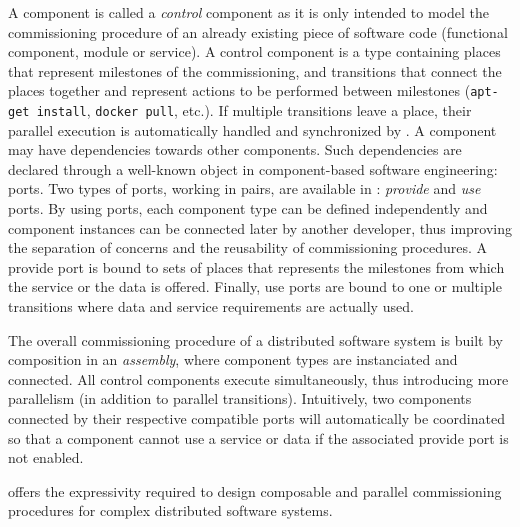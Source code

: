 A \mad component is called a \emph{control} component as it is only
intended to model the commissioning procedure of an already existing
piece of software code (functional component, module or service). A
\mad control component is a type containing places that represent
milestones of the commissioning, and transitions that connect the
places together and represent actions to be performed between
milestones (\eg \texttt{apt-get install}, \texttt{docker pull},
etc.). If multiple transitions leave a place, their parallel execution
is automatically handled and synchronized by \mad. A component may
have dependencies towards other components. Such dependencies are
declared through a well-known object in component-based software
engineering: ports. Two types of ports, working in pairs, are
available in \mad: \emph{provide} and \emph{use} ports. By using
ports, each component type can be defined independently and component
instances can be connected later by another developer, thus improving
the separation of concerns and the reusability of commissioning
procedures. A provide port is bound to sets of places that represents
the milestones from which the service or the data is offered. Finally,
use ports are bound to one or multiple transitions where data and
service requirements are actually used.

The overall commissioning procedure of a distributed software system
is built by composition in an \emph{assembly}, where component
types are instanciated and connected. All control components execute
simultaneously, thus introducing more parallelism (in addition to
parallel transitions). Intuitively, two components connected by their
respective compatible ports will automatically be coordinated so
that a component cannot use a service or data if the associated
provide port is not enabled.

\mad offers the expressivity required to design composable and parallel
commissioning procedures for complex distributed software systems.


